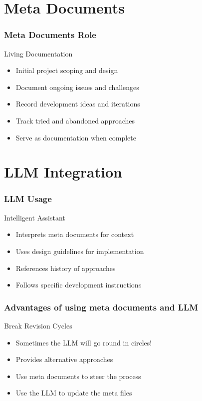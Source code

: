 \documentclass{beamer}
\begin{document}
\section{Meta Documents}
\begin{frame}
    \frametitle{Meta Documents Role}
    \begin{alertblock}{Living Documentation}
        \begin{itemize}
            \item Initial project scoping and design
            \item Document ongoing issues and challenges
            \item Record development ideas and iterations
            \item Track tried and abandoned approaches
            \item Serve as documentation when complete
        \end{itemize}
    \end{alertblock}
\end{frame}

\section{LLM Integration}
\begin{frame}
    \frametitle{LLM Usage}
    \begin{block}{Intelligent Assistant}
        \begin{itemize}
            \item Interprets meta documents for context
            \item Uses design guidelines for implementation
            \item References history of approaches
            \item Follows specific development instructions
        \end{itemize}
    \end{block}
\end{frame}

\begin{frame}
    \frametitle{Advantages of using meta documents and LLM}
    \begin{exampleblock}{Break Revision Cycles}
        \begin{itemize}
            \item Sometimes the  LLM will go round in circles!
            \item Provides alternative approaches
            \item Use meta documents to steer the process
            \item Use the LLM to update the meta files
        \end{itemize}
    \end{exampleblock}
\end{frame}
\end{document}

